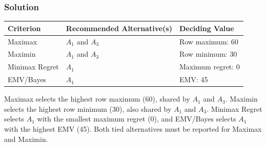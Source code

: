 \subsubsection*{Solution}
\label{subsec:c8-agreement-solution}
\begin{center}
\begin{tabular}{lll}\toprule
Criterion & Recommended Alternative(s) & Deciding Value\\\midrule
Maximax & $A_1$ and $A_3$ & Row maximum: 60\\
Maximin & $A_1$ and $A_3$ & Row minimum: 30\\
Minimax Regret & $A_1$ & Maximum regret: 0\\
EMV/Bayes & $A_1$ & EMV: 45\\\bottomrule
\end{tabular}
\end{center}
Maximax selects the highest row maximum (60), shared by $A_1$ and $A_3$. Maximin selects the highest row minimum (30), also shared by $A_1$ and $A_3$. Minimax Regret selects $A_1$ with the smallest maximum regret (0), and EMV/Bayes selects $A_1$ with the highest EMV (45). Both tied alternatives must be reported for Maximax and Maximin.


